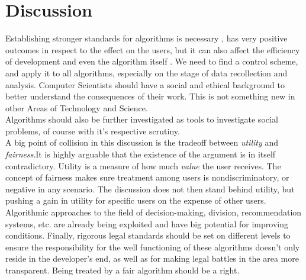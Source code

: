 \section{Discussion}
Establishing stronger standards for algorithms is necessary \cite{UNESCO18}, has very positive outcomes in respect to the effect on the users, but it can also affect the efficiency of development and even the algorithm itself . We need to find a control scheme, and apply it to all algorithms, especially on the stage of data recollection and analysis. Computer Scientists should have a social and ethical background to better understand the consequences of their work. This is not something new in other Areas of Technology and Science.\\
Algorithms should also be further investigated as tools to investigate social problems, of course with it's respective scrutiny.\\
A big point of collision in this discussion is the tradeoff between \textsl{utility} and \textsl{fairness}.It is highly arguable that the existence of the argument is in itself contradictory. Utility is a measure of how much \textsl{value} the user receives. The concept of fairness makes sure treatment among users is nondiscriminatory, or negative in any scenario. The discussion does not then stand behind utility, but pushing a gain in utility for specific users on the expense of other users.\\
Algorithmic approaches to the field of decision-making, division, recommendation systems, etc. are already being exploited and have big potential for improving conditions.
Finally, rigorous legal standards should be set on different levels to ensure the responsibility for the well functioning of these algorithms doesn't only reside in the developer's end, as well as for making legal battles in the area more transparent. Being treated by a fair algorithm should be a right.
